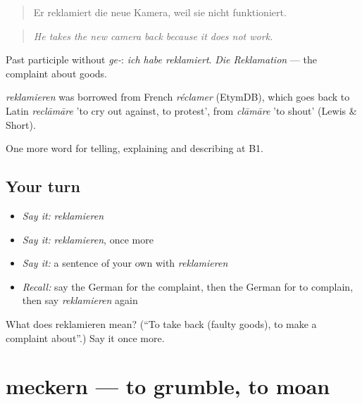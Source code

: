 \begin{quote}
Er reklamiert die neue Kamera, weil sie nicht funktioniert.
\end{quote}

\begin{quote}
\emph{He takes the new camera back because it does not work.}
\end{quote}

Past participle without \emph{ge-}: \emph{ich habe reklamiert}. \emph{Die Reklamation} — the complaint about goods.

\begin{cousinweb}
\emph{reklamieren} was borrowed from French \emph{réclamer} (EtymDB), which goes back to Latin \emph{reclāmāre} 'to cry out against, to protest', from \emph{clāmāre} 'to shout' (Lewis \& Short).
\end{cousinweb}

\begin{grammarlens}[title={What you've built}]
One more word for telling, explaining and describing at B1.
\end{grammarlens}

\subsection*{Your turn}
\begin{itemize}
\raggedright
  \item \emph{Say it:} \emph{reklamieren}
  \item \emph{Say it:} \emph{reklamieren}, once more
  \item \emph{Say it:} a sentence of your own with \emph{reklamieren}
  \item \emph{Recall:} say the German for the complaint, then the German for to complain, then say \emph{reklamieren} again
\end{itemize}

\begin{tcolorbox}[breakable,colback=teal!4,colframe=teal!35!black,title={Before you move on}]
What does reklamieren mean? (\textquotedblleft{}To take back (faulty goods), to make a complaint about\textquotedblright{}.) Say it once more.
\end{tcolorbox}
\section[meckern]{meckern — to grumble, to moan}

\label{lesson:GE-C431-meckern}




